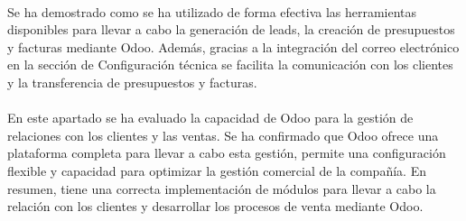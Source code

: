 \paragraph{}
Se ha demostrado como se ha utilizado de forma efectiva las herramientas disponibles para llevar a cabo la generación de leads, la creación de presupuestos y facturas mediante Odoo. Además, gracias a la integración del correo electrónico en la sección de Configuración técnica se facilita la comunicación con los clientes y la transferencia de presupuestos y facturas.
\paragraph{}
En este apartado se ha evaluado la capacidad de Odoo para la gestión de relaciones con los clientes y las ventas. Se ha confirmado que Odoo ofrece una plataforma completa para llevar a cabo esta gestión, permite una configuración flexible y capacidad para optimizar la gestión comercial de la compañía. En resumen, tiene una correcta implementación de módulos para llevar a cabo la relación con los clientes y desarrollar los procesos de venta mediante Odoo. 